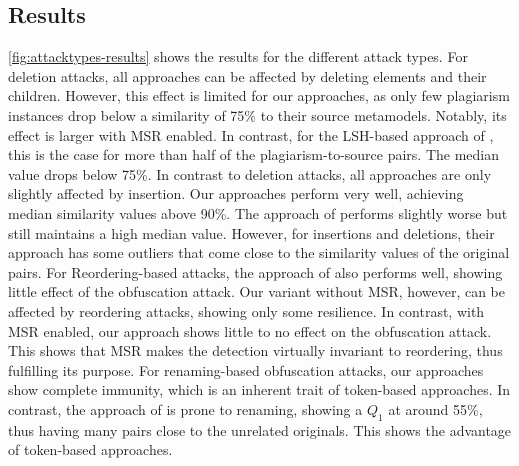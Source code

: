  \subsection{Results}
\autoref{fig:attacktypes-results} shows the results for the different attack types.
For deletion attacks, all approaches can be affected by deleting elements and their children. However, this effect is limited for our approaches, as only few plagiarism instances drop below a similarity of 75\% to their source metamodels. Notably, its effect is larger with MSR enabled.
In contrast, for the LSH-based approach of \citet{Martinez2020}, this is the case for more than half of the plagiarism-to-source pairs. The median value drops below 75\%.
In contrast to deletion attacks, all approaches are only slightly affected by insertion. Our approaches perform very well, achieving median similarity values above 90\%. The approach of \citet{Martinez2020} performs slightly worse but still maintains a high median value.
However, for insertions and deletions, their approach has some outliers that come close to the similarity values of the original pairs.
For Reordering-based attacks, the approach of \citet{Martinez2020} also performs well, showing little effect of the obfuscation attack.
Our variant without MSR, however, can be affected by reordering attacks, showing only some resilience.
In contrast, with MSR enabled, our approach shows little to no effect on the obfuscation attack. This shows that MSR makes the detection virtually invariant to reordering, thus fulfilling its purpose.
For renaming-based obfuscation attacks, our approaches show complete immunity, which is an inherent trait of token-based approaches.
In contrast, the approach of \citet{Martinez2020} is prone to renaming, showing a $Q_1$ at around 55\%, thus having many pairs close to the unrelated originals. This shows the advantage of token-based approaches.

